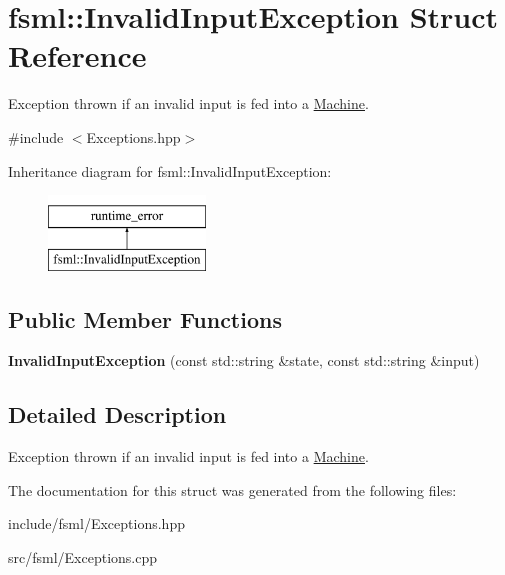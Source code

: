 \hypertarget{structfsml_1_1InvalidInputException}{\section{fsml\-:\-:Invalid\-Input\-Exception Struct Reference}
\label{structfsml_1_1InvalidInputException}
}


Exception thrown if an invalid input is fed into a \hyperlink{classfsml_1_1Machine}{Machine}.  




{\ttfamily \#include $<$Exceptions.\-hpp$>$}

Inheritance diagram for fsml\-:\-:Invalid\-Input\-Exception\-:\begin{figure}[H]
\begin{center}
\leavevmode
\includegraphics[height=2.000000cm]{structfsml_1_1InvalidInputException}
\end{center}
\end{figure}
\subsection*{Public Member Functions}
\begin{DoxyCompactItemize}
\item 
\hypertarget{structfsml_1_1InvalidInputException_aa7373c1db918bf47817d2d85e089ee50}{{\bfseries Invalid\-Input\-Exception} (const std\-::string \&state, const std\-::string \&input)}\label{structfsml_1_1InvalidInputException_aa7373c1db918bf47817d2d85e089ee50}

\end{DoxyCompactItemize}


\subsection{Detailed Description}
Exception thrown if an invalid input is fed into a \hyperlink{classfsml_1_1Machine}{Machine}. 



The documentation for this struct was generated from the following files\-:\begin{DoxyCompactItemize}
\item 
include/fsml/Exceptions.\-hpp\item 
src/fsml/Exceptions.\-cpp\end{DoxyCompactItemize}
